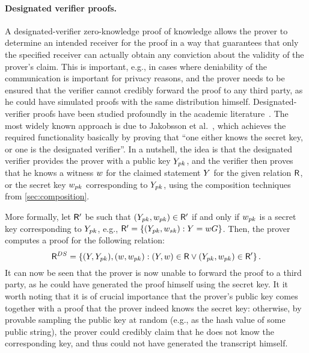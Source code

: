 \documentclass[runningheads]{llncs}
\begin{document}
\paragraph{Designated verifier proofs.}
A designated-verifier zero-knowledge proof of knowledge allows the prover to determine an intended receiver for the proof in a way that guarantees that only the specified receiver can actually obtain any conviction about the validity of the prover's claim.
This is important, e.g., in cases where deniability of the communication is important for privacy reasons, and the prover needs to be ensured that the verifier cannot credibly forward the proof to any third party, as he could have simulated proofs with the same distribution himself.
Designated-verifier proofs have been studied profoundly in the academic literature~\cite{EC:JakSakImp96,EC:ChaCou18}.
The most widely known approach is due to Jakobsson et al.~\cite{EC:JakSakImp96}, which achieves the required functionality basically by proving that ``one either knows the secret key, or one is the designated verifier''.
In a nutshell, the idea is that the designated verifier provides the prover with a public key $Y_{pk}$, and the verifier then proves that he knows a witness $w$ for the claimed statement $Y$ for the given relation $\mathsf{R}$, or the secret key $w_{pk}$ corresponding to $Y_{pk}$, using the composition techniques from \cref{sec:composition}.

More formally, let $\mathsf{R}'$ be such that $(Y_{pk},w_{pk})\in\mathsf{R}'$ if and only if $w_{pk}$ is a secret key corresponding to $Y_{pk}$, e.g., $\mathsf{R}'=\{(Y_{pk},w_{sk}):Y=w G\}$.
Then, the prover computes a proof for the following relation:
$$
  \mathsf{R}^{DS} = \{(Y,Y_{pk}),(w,w_{pk}) : (Y,w)\in\mathsf{R}\lor (Y_{pk},w_{pk})\in\mathsf{R}'\}\,.
$$
It can now be seen that the prover is now unable to forward the proof to a third party, as he could have generated the proof himself using the secret key.
It it worth noting that it is of crucial importance that the prover's public key comes together with a proof that the prover indeed knows the secret key:
otherwise, by provable sampling the public key at random (e.g., as the hash value of some public string), the prover could credibly claim that he does not know the corresponding key, and thus could not have generated the transcript himself.
\end{document}
